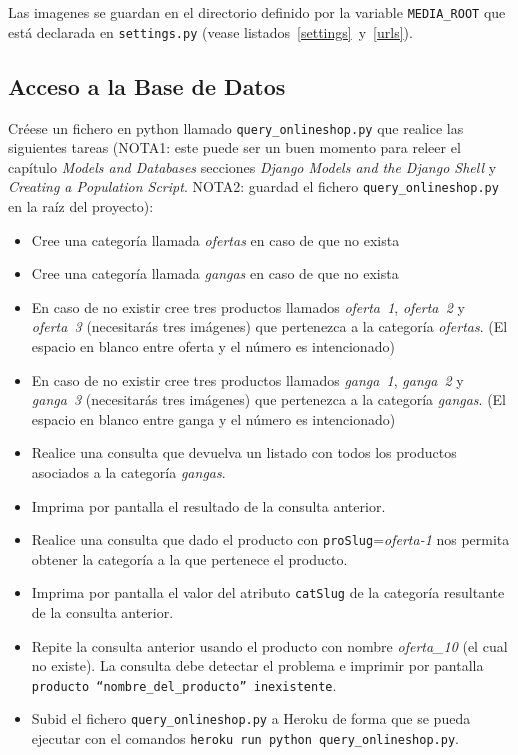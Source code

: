 \documentclass[12pt]{article} %
\newcommand{\ttt}[1]{\texttt{#1}}%
\newcommand{\settings}{\texttt{settings.py}}%
\begin{document}
Las imagenes se guardan en el directorio definido por la variable  \ttt{MEDIA\_ROOT} que está declarada en \settings{} (vease listados~\ref{settings}~y~\ref{urls}).
\subsection{Acceso a la Base de Datos}

Créese un fichero en python llamado \texttt{query\_onlineshop.py} que realice las siguientes tareas (NOTA1: este puede ser un buen momento para releer el capítulo \textit{Models and Databases} secciones \textit{Django Models and the Django Shell} y \textit{Creating a Population Script}. NOTA2: guardad el fichero \texttt{query\_onlineshop.py} en la raíz del proyecto):

\begin{itemize}
    \item Cree una categoría llamada \textit{ofertas} en caso de que no exista 
    \item Cree una categoría llamada \textit{gangas} en caso de que no exista 
    \item En caso de no existir cree tres productos llamados \textit{oferta~1}, \textit{oferta~2} y \textit{oferta~3} (necesitarás tres imágenes) que pertenezca a la categoría \textit{ofertas}. (El espacio en blanco entre oferta y el número es intencionado)
    \item En caso de no existir cree tres productos llamados \textit{ganga~1}, \textit{ganga~2} y \textit{ganga~3} (necesitarás tres imágenes) que pertenezca a la categoría \textit{gangas}. (El espacio en blanco entre ganga y el número es intencionado)
    \item Realice una consulta que devuelva un listado con todos los productos asociados a la categoría \textit{gangas}.
    \item Imprima por pantalla el resultado de la consulta anterior.
    \item Realice una consulta que dado el producto con \texttt{proSlug}=\textit{oferta-1} nos permita obtener la categoría a la que pertenece el producto.
    \item Imprima por pantalla el valor del atributo \texttt{catSlug} de la categoría resultante de la consulta anterior.
    \item Repite la consulta anterior usando el producto con nombre \textit{oferta\_10} (el cual no existe). La consulta debe detectar el problema e imprimir por pantalla \texttt{producto ``nombre\_del\_producto'' inexistente}.
    \item Subid el fichero \texttt{query\_onlineshop.py} a Heroku de forma que se pueda ejecutar con el comandos
    \texttt{heroku run python query\_onlineshop.py}.
    
\end{itemize}
\end{document}
